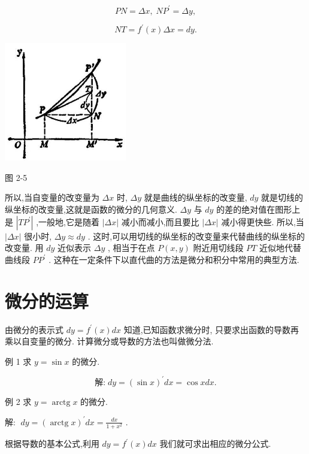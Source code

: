 \documentclass[lang=cn,newtx,10pt,scheme=chinese]{elegantbook}
\begin{document}
\[
{PN} = {\Delta x},\;N{P}^{\prime } = {\Delta y},
\]

\[
{NT} = {f}^{\prime }\left( x\right) {\Delta x} = {dy}.
\]

\begin{center}
\includegraphics[max width=0.4\textwidth]{images/01912c18-5c3f-733d-b775-749ba9897a9d_113_880246.jpg}
\end{center}

图 2-5

所以,当自变量的改变量为 \({\Delta x}\) 时, \({\Delta y}\) 就是曲线的纵坐标的改变量, \({dy}\) 就是切线的纵坐标的改变量,这就是函数的微分的几何意义. \({\Delta y}\) 与 \({dy}\) 的差的绝对值在图形上是 \(\left| {T{P}^{\prime }}\right|\) ,一般地,它是随着 \(\left| {\Delta x}\right|\) 减小而减小,而且要比 \(\left| {\Delta x}\right|\) 减小得更快些. 所以,当 \(\left| {\Delta x}\right|\) 很小时, \({\Delta y} \approx {dy}\) . 这时,可以用切线的纵坐标的改变量来代替曲线的纵坐标的改变量. 用 \({dy}\) 近似表示 \({\Delta y}\) , 相当于在点 \(P\left( {x,y}\right)\) 附近用切线段 \({PT}\) 近似地代替曲线段 \(P{P}^{\prime }\) . 这种在一定条件下以直代曲的方法是微分和积分中常用的典型方法.

\section{微分的运算}

由微分的表示式 \({dy} = {f}^{\prime }\left( x\right) {dx}\) 知道,已知函数求微分时, 只要求出函数的导数再乘以自变量的微分. 计算微分或导数的方法也叫做微分法.

例 1 求 \(y = \sin x\) 的微分.

\[
\text{解:}\;{dy} = {\left( \sin x\right) }^{\prime }{dx} = \cos {xdx}\text{.}
\]

例 2 求 \(y = \operatorname{arctg}x\) 的微分.

解: \(\;{dy} = {\left( \operatorname{arctg}x\right) }^{\prime }{dx} = \frac{dx}{1 + {x}^{2}}\) .

根据导数的基本公式,利用 \({dy} = {f}^{\prime }\left( x\right) {dx}\) 我们就可求出相应的微分公式.
\end{document}
